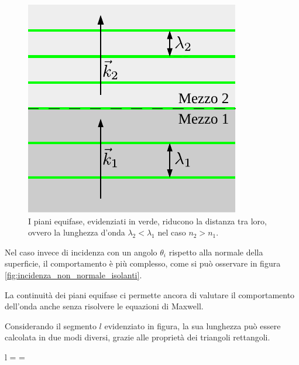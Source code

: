 	\begin{figure}[ht]
		\centering
		\includegraphics{img/incidenza_normale.pdf}
		\caption{I piani equifase, evidenziati in verde, riducono la distanza tra loro, ovvero la lunghezza d'onda $\lambda_2 < \lambda_1$ nel caso $n_2 > n_1$.}
		\label{fig:incidenza_normale_isolanti}
	\end{figure}

	Nel caso invece di incidenza con un angolo $\theta_i$ rispetto alla normale della superficie, il comportamento è più complesso, come si può osservare in figura \ref{fig:incidenza_non_normale_isolanti}.

	La continuità dei piani equifase ci permette ancora di valutare il comportamento dell'onda anche senza risolvere le equazioni di Maxwell.

	Considerando il segmento $l$ evidenziato in figura, la sua lunghezza può essere calcolata in due modi diversi, grazie alle proprietà dei triangoli rettangoli.

	\begin{esp} \label{eq:legge_di_schnell}
		l =  = 
	\end{esp}

